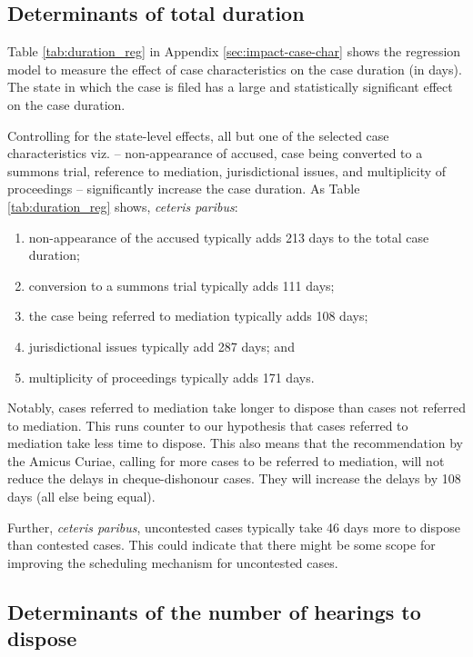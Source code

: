 \subsection{Determinants of total duration} \label{sec:determ-total-durat}

Table \ref{tab:duration_reg} in Appendix \ref{sec:impact-case-char} shows the regression model to measure the effect of case characteristics on the case duration (in days). The state in which the case is filed has a large and statistically significant effect on the case duration.

Controlling for the state-level effects, all but one of the selected case characteristics viz. -- non-appearance of accused, case being converted to a summons trial, reference to mediation, jurisdictional issues, and multiplicity of proceedings -- significantly increase the case duration. As Table \ref{tab:duration_reg} shows, \emph{ceteris paribus}:

\begin{enumerate}
\item non-appearance of the accused typically adds 213 days to the total case duration;
\item conversion to a summons trial typically adds 111 days;
\item the case being referred to mediation typically adds 108 days;
\item jurisdictional issues typically add 287 days; and
\item multiplicity of proceedings typically adds 171 days.
\end{enumerate}

Notably, cases referred to mediation take longer to dispose than cases not referred to mediation. This runs counter to our hypothesis that cases referred to mediation take less time to dispose. This also means that the recommendation by the Amicus Curiae, calling for more cases to be referred to mediation, will not reduce the delays in cheque-dishonour cases. They will increase the delays by 108 days (all else being equal).

Further, \emph{ceteris paribus}, uncontested cases typically take 46 days more to dispose than contested cases. This could indicate that there might be some scope for improving the scheduling mechanism for uncontested cases.

\subsection{Determinants of the number of hearings to dispose} \label{sec:determ-numb-hear}

